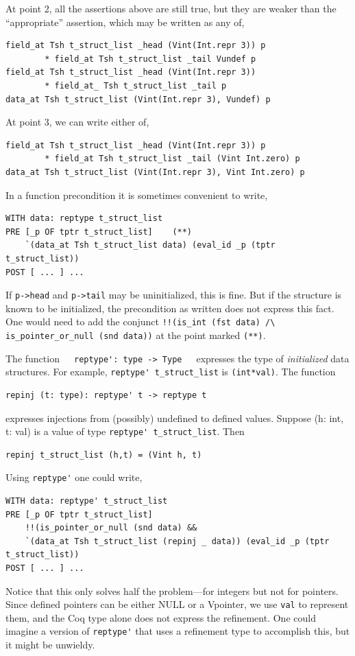 \documentclass[12pt,fleqn,openany,oneside,showtrims]{memoir}
\begin{document}
At point 2, all the assertions above are still true, but
they are weaker than the ``appropriate'' assertion, which
may be written as any of,
\begin{lstlisting}
field_at Tsh t_struct_list _head (Vint(Int.repr 3)) p
        * field_at Tsh t_struct_list _tail Vundef p
field_at Tsh t_struct_list _head (Vint(Int.repr 3)) 
        * field_at_ Tsh t_struct_list _tail p
data_at Tsh t_struct_list (Vint(Int.repr 3), Vundef) p
\end{lstlisting}

At point 3, we can write either of,
\begin{lstlisting}
field_at Tsh t_struct_list _head (Vint(Int.repr 3)) p 
        * field_at Tsh t_struct_list _tail (Vint Int.zero) p
data_at Tsh t_struct_list (Vint(Int.repr 3), Vint Int.zero) p
\end{lstlisting}


In a function precondition it is sometimes convenient to write,
\begin{lstlisting}
WITH data: reptype t_struct_list
PRE [_p OF tptr t_struct_list]    (**)  
    `(data_at Tsh t_struct_list data) (eval_id _p (tptr t_struct_list))
POST [ ... ] ...
\end{lstlisting}
If \lstinline{p->head} and 
\lstinline{p->tail} may be uninitialized, this is fine.
But if the structure is known to be initialized, the precondition
as written does not express this fact.  One would need to
add the conjunct \linebreak
\lstinline{!!(is_int (fst data) /\ is_pointer_or_null (snd data))}\linebreak
at the point marked \lstinline{(**)}.

The function~~~\lstinline{reptype': type -> Type}\ \ \ expresses
the type of \emph{initialized} data structures.  For example,
\lstinline{reptype' t_struct_list} is \lstinline{(int*val)}.
The function 
\begin{lstlisting}
repinj (t: type): reptype' t -> reptype t
\end{lstlisting}
expresses injections from (possibly) undefined to defined values.
Suppose (h: int, t: val) is a value of type 
\lstinline{reptype' t_struct_list}.  Then
\begin{lstlisting}
repinj t_struct_list (h,t) = (Vint h, t)
\end{lstlisting}

Using \lstinline{reptype'} one could write,
\begin{lstlisting}
WITH data: reptype' t_struct_list
PRE [_p OF tptr t_struct_list]
    !!(is_pointer_or_null (snd data) &&
    `(data_at Tsh t_struct_list (repinj _ data)) (eval_id _p (tptr t_struct_list))
POST [ ... ] ...
\end{lstlisting}
Notice that this only solves half the problem---for integers but not for
pointers.  Since defined pointers can be either NULL or a Vpointer,
we use \lstinline{val} to represent them, and the Coq type alone
does not express the refinement.  One could imagine 
a version of \lstinline{reptype'} that uses a refinement type
to accomplish this, but it might be unwieldy.
\end{document}
